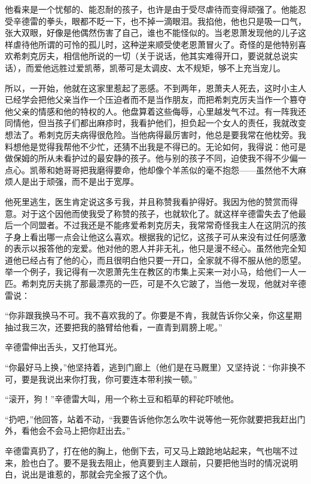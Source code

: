 \par 他看来是一个忧郁的、能忍耐的孩子，也许是由于受尽虐待而变得顽强了。他能忍受辛德雷的拳头，眼都不眨一下，也不掉一滴眼泪。我掐他，他也只是吸一口气，张大双眼，好像是他偶然伤害了自己，谁也不能怪似的。当老恩萧发现他的儿子这样虐待他所谓的可怜的孤儿时，这种逆来顺受使老恩萧冒火了。奇怪的是他特别喜欢希刺克厉夫，相信他所说的一切（关于说话，他其实难得开口，要说就总说实话），而爱他远胜过爱凯蒂，凯蒂可是太调皮、太不规矩，够不上充当宠儿。
\par 所以，一开始，他就在这家里惹起了恶感。不到两年，恩萧夫人死去，这时小主人已经学会把他父亲当作一个压迫者而不是当作朋友，而把希刺克厉夫当作一个篡夺他父亲的情感和他的特权的人。他盘算着这些侮辱，心里越发气不过。有一阵我还同情他，但当孩子们都出麻疹时，我看护他们，担负起一个女人的责任，我就改变想法了。希刺克厉夫病得很危险。当他病得最厉害时，他总是要我常在他枕旁。我料想他是觉得我帮他不少忙，还猜不出我是不得已的。无论如何，我得说：他可是做保姆的所从未看护过的最安静的孩子。他与别的孩子不同，迫使我不得不少偏一点心。凯蒂和她哥哥把我磨得要命，他却像个羊羔似的毫不抱怨——虽然他不大麻烦人是出于顽强，而不是出于宽厚。
\par 他死里逃生，医生肯定说这多亏我，并且称赞我看护得好。我因为他的赞赏而得意。对于这个因他而使我受了称赞的孩子，也就软化了。就这样辛德雷失去了他最后一个同盟者。不过我还是不能疼爱希刺克厉夫，我常常奇怪我主人在这阴沉的孩子身上看出哪一点会让他这么喜欢。根据我的记忆，这孩子可从来没有过任何感激的表示以报答他的宠爱。他对他的恩人并非无礼，他只是漫不经心。虽然他完全知道他已经占有了他的心，而且很明白他只要一开口，全家就不得不服从他的愿望。举一个例子，我记得有一次恩萧先生在教区的市集上买来一对小马，给他们一人一匹。希刺克厉夫挑了那最漂亮的一匹，可是不久它跛了，当他一发现，他就对辛德雷说：
\par “你非跟我换马不可。我不喜欢我的了。你要是不肯，我就告诉你父亲，你这星期抽过我三次，还要把我的胳臂给他看，一直青到肩膀上呢。”
\par 辛德雷伸出舌头，又打他耳光。
\par “你最好马上换，”他坚持着，逃到门廊上（他们是在马厩里）又坚持说：“你非换不可，要是我说出来你打我，你可要连本带利挨一顿。”
\par “滚开，狗！”辛德雷大叫，用一个称土豆和稻草的秤砣吓唬他。
\par “扔吧，”他回答，站着不动，“我要告诉他你怎么吹牛说等他一死你就要把我赶出门外，看他会不会马上把你赶出去。”
\par 辛德雷真扔了，打在他的胸上，他倒下去，可又马上踉跄地站起来，气也喘不过来，脸也白了。要不是我去阻止，他真要到主人跟前，只要把他当时的情况说明白，说出是谁惹的，那就会完全报了这个仇。
